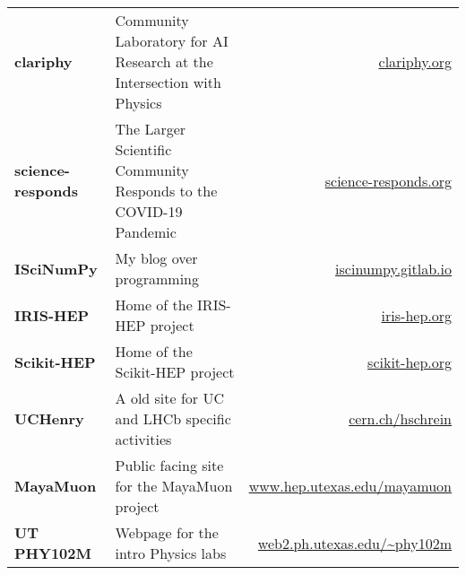 \documentclass[10pt,letterpaper]{moderncv}
\begin{document}

\begin{tabularx}{\textwidth}{>{\bfseries}p{1.45in}Xr}
clariphy & Community Laboratory for AI Research at the Intersection with Physics & \url{clariphy.org} \\
science-responds & The Larger Scientific Community Responds to the COVID-19 Pandemic & \url{science-responds.org} \\
ISciNumPy & My blog over programming & \url{iscinumpy.gitlab.io} \\
IRIS-HEP & Home of the IRIS-HEP project & \url{iris-hep.org} \\
Scikit-HEP & Home of the Scikit-HEP project & \url{scikit-hep.org} \\
UCHenry & A old site for UC and LHCb specific activities & \url{cern.ch/hschrein}  \\
MayaMuon & Public facing site for the MayaMuon project & \url{www.hep.utexas.edu/mayamuon} \\
UT PHY102M & Webpage for the intro Physics labs & \url{web2.ph.utexas.edu/~phy102m}  \\
\end{tabularx}


\end{document}
